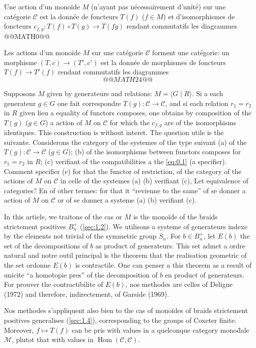 \documentclass[11pt,a4paper]{article}
\theoremstyle{plain}
\theoremstyle{definition}
\DeclareMathOperator{\Hom}{Hom}
\newcommand{\cC}{\mathscr{C}}
\newcommand{\cM}{\mathscr{M}}
\begin{document}
Une action d'un mono\"ide $M$ (n'ayant pas n\'ecessairement d'unit\'e) sur une cat\'egorie $\cC$ est la donn\'ee de foncteurs $T(f)$ ($f \in M$) et d'isomorphismes de foncteurs $c_{f,g} : T(f) \circ T(g) \to T(fg)$ rendant commutatifs les diagrammes
@@MATH0@@

Les actions d'un mono\"ide $M$ sur une cat\'egorie $\cC$ forment une cat\'egorie: un morphisme $(T,c) \to (T',c')$ est la donn\'ee de morphismes de foncteurs $T(f) \to T'(f)$ rendant commutatifs les diagrammes
\[
@@MATH24@@
\]

Supposons $M$ given by generateurs and relations: $M = \langle G \mid R \rangle$. Si a each generateur $g \in G$ one fait correspondre $T(g) : \cC \to \cC$, and si each relation $r_1 = r_2$ in $R$ given lieu a equality of functors composes, one obtains by composition of the $T(g)$ ($g \in G$) a action of $M$ on $\cC$ for which the $c_{f,g}$ are of the isomorphisms identiques. This construction is without interet. The question utile is the suivante. Considerons the category of the systemes of the type suivant (a) of the $T(g) : \cC \to \cC$ ($g \in G$); (b) of the isomorphisms between functors composes for $r_1 = r_2$ in $R$; (c) verifiant of the compatibilities a the \eqref{eq:0.1} (a specifier). Comment specifier (c) for that the functor of restriction, of the category of the actions of $M$ on $\cC$ in celle of the systemes (a) (b) verifiant (c), Let equivalence of categories? En of other termes: for that it ``revienne to the same'' of se donner a action of $M$ on $\cC$ or of se donner a systeme (a) (b) verifiant (c).

In this article, we traitons of the cas or $M$ is the mono\"ide of the braids strictement positives $B_n^+$ (\ref{sec:1.2}). We utilisons a systeme of generateurs indexe by the elements not trivial of the symmetric group $S_n$. For $b \in B_n^+$, let $E(b)$ the set of the decompositions of $b$ as product of generateurs. This set admet a ordre natural and notre outil principal is the theorem that the realisation geometric of the set ordonne $E(b)$ is contractile. One can penser a this theorem as a result of unicite ``a homotopie pres'' of the decomposition of $b$ en product of generateurs. For prouver the contractibilite of $E(b)$, nos methodes are celles of Deligne (1972) and therefore, indirectement, of Garside (1969).

Nos methodes s'appliquent also bien to the cas of mono\"ides of braids strictement positives generalises (\ref{sec:1.4}), corresponding to the groups of Coxeter finite. Moreover, $f \mapsto T(f)$ can be pris with values in a quelconque category mono\"dale $\cM$, plutot that with values in $\Hom(\cC, \cC)$.
\end{document}
